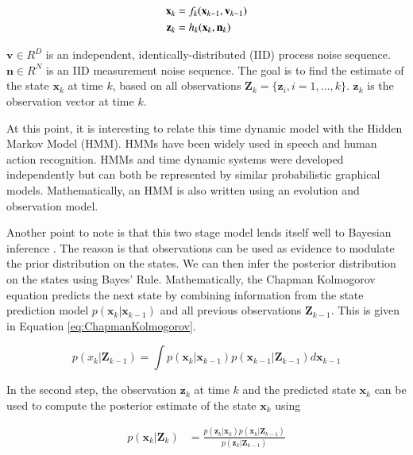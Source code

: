 \documentclass[12pt,letterpaper,doublespaced,ETD,proposal]{gt-ece-thesis}
\begin{document}
\begin{Body}
\begin{align}
\mathbf{x}_k &= f_k(\mathbf{x}_{k-1}, \mathbf{v}_{k-1}) \notag\\
\mathbf{z}_k &= h_k(\mathbf{x}_k, \mathbf{n}_k)
\label{Eq:TDS}
\end{align}

$\mathbf{v} \in R^D$ is an independent, identically-distributed (IID) process noise sequence.  $\mathbf{n} \in R^N$ is an IID measurement noise sequence.  The goal is to find the estimate of the state $\mathbf{x}_k$ at time $k$, based on all observations $\mathbf{Z}_k={\{\mathbf{z}_i, i=1,...,k\}}$.   $\mathbf{z}_k$ is the observation vector at time $k$.  

At this point, it is interesting to relate this time dynamic model with the Hidden Markov Model (HMM).  HMMs have been widely used in speech and human action recognition.  HMMs and time dynamic systems were developed independently \cite{2007_BOOK_PRML_Bishop} but can both be represented by similar probabilistic graphical models.  Mathematically, an HMM is also written using an evolution and observation model.  

Another point to note is that this two stage model lends itself well to Bayesian inference \cite{2002_JNL_PF_Arulampalam}.  The reason is that observations can be used as evidence to modulate the prior distribution on the states.  We can then infer the posterior distribution on the states using Bayes' Rule.  Mathematically, the Chapman Kolmogorov equation predicts the next state by combining information from the state prediction model $p(\mathbf{x}_k| \mathbf{x}_{k-1})$ and all previous observations $\mathbf{Z}_{k-1}$.  This is given in Equation \ref{eq:ChapmanKolmogorov}.

\begin{equation}
p(x_k|\textbf{Z}_{k-1})=
\int{p(\mathbf{x}_k| \mathbf{x}_{k-1})p(\mathbf{x}_{k-1}|\mathbf{Z}_{k-1})}d\mathbf{x}_{k-1}
\label{eq:ChapmanKolmogorov}
\end{equation}  

In the second step, the observation $\mathbf{z}_k$ at time $k$ and the predicted state $\mathbf{x}_k$ can be used to compute the posterior estimate of the state $\mathbf{x}_k$ using 

\begin{align}
	p(\mathbf{x}_k|\textbf{Z}_k)	&= \frac{p(\mathbf{z}_k|\mathbf{x}_k)p(\mathbf{x}_k |\textbf{Z}_{k-1})   }{p(\mathbf{z}_k| \textbf{Z}_{k-1})}
\label{eq:posterior}			
\end{align}


\end{Body}
\end{document}
